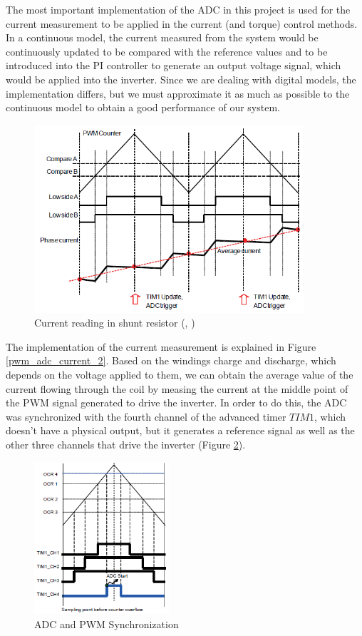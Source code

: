 The most important implementation of the \ac{ADC} in this project is used for the current measurement to be applied in the current (and torque) control methods. In a continuous model, the current measured from the system would be continuously updated to be compared with the reference values and to be introduced into the \ac{PI} controller to generate an output voltage signal, which would be applied into the inverter. Since we are dealing with digital models, the implementation differs, but we must approximate it as much as possible to the continuous model to obtain a good performance of our system.

\begin{figure}[htbp]
\centering
\includegraphics[width=10cm]{Images/pwm_adc_current_2.png} 
\caption[Current reading in shunt resistor]{Current reading in shunt resistor (\citeauthor{stm32FOC}, \citeyear{stm32FOC})}
\label{fig:pwm_adc_current_2}
\end{figure}

The implementation of the current measurement is explained in Figure \ref{pwm_adc_current_2}. Based on the windings charge and discharge, which depends on the voltage applied to them, we can obtain the average value of the current flowing through the coil by measing the current at the middle point of the PWM signal generated to drive the inverter. In order to do this, the \ac{ADC} was synchronized with the fourth channel of the advanced timer $TIM1$, which doesn't have a physical output, but it generates a reference signal as well as the other three channels that drive the inverter (Figure \ref{fig:pwm_adc}).

\begin{figure}[htbp]
\centering
\includegraphics[width=5cm]{Images/pwm_adc.png} 
\caption[ADC and PWM Synchronization]{ADC and PWM Synchronization}
\label{fig:pwm_adc}
\end{figure}

